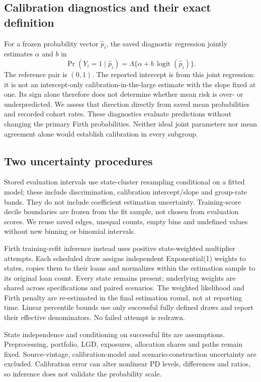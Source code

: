 \subsection{Calibration diagnostics and their exact definition}
For a frozen probability vector $\widehat p_i$, the saved diagnostic regression jointly estimates $\alpha$ and $b$ in
\[\Pr(Y_i=1\mid\widehat p_i)=\Lambda\{\alpha+b\,\operatorname{logit}(\widehat p_i)\}.\]
The reference pair is $(0,1)$. The reported intercept is from this joint regression: it is not an intercept-only calibration-in-the-large estimate with the slope fixed at one. Its sign alone therefore does not determine whether mean risk is over- or underpredicted. We assess that direction directly from saved mean probabilities and recorded cohort rates. These diagnostics evaluate predictions without changing the primary Firth probabilities. Neither ideal joint parameters nor mean agreement alone would establish calibration in every subgroup.

\subsection{Two uncertainty procedures}
Stored evaluation intervals use state-cluster resampling conditional on a fitted model; these include discrimination, calibration intercept/slope and group-rate bands. They do not include coefficient estimation uncertainty. Training-score decile boundaries are frozen from the fit sample, not chosen from evaluation scores. We reuse saved edges, unequal counts, empty bins and undefined values without new binning or binomial intervals.

Firth training-refit inference instead uses positive state-weighted multiplier attempts. Each scheduled draw assigns independent Exponential(1) weights to states, copies them to their loans and normalizes within the estimation sample to its original loan count. Every state remains present; underlying weights are shared across specifications and paired scenarios. The weighted likelihood and Firth penalty are re-estimated in the final estimation round, not at reporting time. Linear percentile bounds use only successful fully defined draws and report their effective denominators. No failed attempt is redrawn.


State independence and conditioning on successful fits are assumptions. Preprocessing, portfolio, LGD, exposures, allocation shares and paths remain fixed. Source-vintage, calibration-model and scenario-construction uncertainty are excluded. Calibration error can alter nonlinear PD levels, differences and ratios, so inference does not validate the probability scale.

